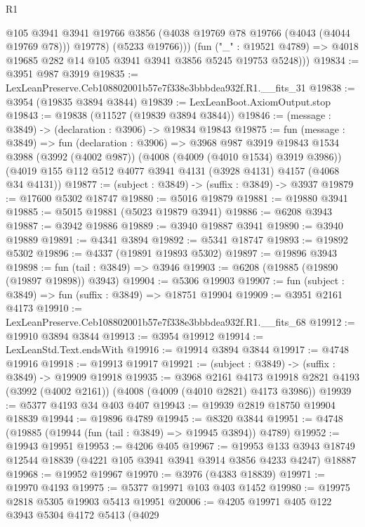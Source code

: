 \begin{lexlean}{R1}
\begin{coremodule}
              @105
              @3941
              @3941
              @19766
              @3856
              (@4038 @19769 @78 @19766 (@4043 (@4044 @19769 @78)))
              @19778)
            (@5233 @19766)))
        (fun ("_" : @19521 @4789) =>
        @4018 @19685 @282 @14 @105 @3941 @3941 @3856 @5245 @19753 @5248)))
@19834 := @3951 @987 @3919
@19835 := LexLeanPreserve.Ceb108802001b57e7f338e3bbbdea932f.R1.__fits_31
@19838 := @3954 (@19835 @3894 @3844)
@19839 := LexLeanBoot.AxiomOutput.stop
@19843 := @19838 (@11527 (@19839 @3894 @3844))
@19846 := (message : @3849) -> (declaration : @3906) -> @19834 @19843
@19875 := fun (message : @3849) =>
  fun (declaration : @3906) =>
  @3968
    @987
    @3919
    @19843
    @1534
    @3988
    (@3992 (@4002 @987))
    (@4008 (@4009 (@4010 @1534) @3919 @3986))
    (@4019 @155 @112 @512 @4077 @3941 @4131 (@3928 @4131) @4157 (@4068 @34 @4131))
@19877 := (subject : @3849) -> (suffix : @3849) -> @3937
@19879 := @17600 @5302 @18747
@19880 := @5016 @19879
@19881 := @19880 @3941
@19885 := @5015 @19881 (@5023 @19879 @3941)
@19886 := @6208 @3943
@19887 := @3942 @19886
@19889 := @3940 @19887 @3941
@19890 := @3940 @19889
@19891 := @4341 @3894
@19892 := @5341 @18747
@19893 := @19892 @5302
@19896 := @4337 (@19891 @19893 @5302)
@19897 := @19896 @3943
@19898 := fun (tail : @3849) => @3946
@19903 := @6208 (@19885 (@19890 (@19897 @19898)) @3943)
@19904 := @5306 @19903
@19907 := fun (subject : @3849) => fun (suffix : @3849) => @18751 @19904
@19909 := @3951 @2161 @4173
@19910 := LexLeanPreserve.Ceb108802001b57e7f338e3bbbdea932f.R1.__fits_68
@19912 := @19910 @3894 @3844
@19913 := @3954 @19912
@19914 := LexLeanStd.Text.endsWith
@19916 := @19914 @3894 @3844
@19917 := @4748 @19916
@19918 := @19913 @19917
@19921 := (subject : @3849) -> (suffix : @3849) -> @19909 @19918
@19935 := @3968
    @2161
    @4173
    @19918
    @2821
    @4193
    (@3992 (@4002 @2161))
    (@4008 (@4009 (@4010 @2821) @4173 @3986))
@19939 := @5377 @4193 @34 @403 @407
@19943 := @19939 @2819 @18750 @19904 @18839
@19944 := @19896 @4789
@19945 := @8320 @3844
@19951 := @4748 (@19885 (@19944 (fun (tail : @3849) => @19945 @3894)) @4789)
@19952 := @19943 @19951
@19953 := @4206 @405
@19967 := @19953
    @133
    @3943
    @18749
    @12544
    @18839
    (@4221 @105 @3941 @3941 @3914 @3856 @4233 @4247)
    @18887
@19968 := @19952 @19967
@19970 := @3976 (@4383 @18839)
@19971 := @19970 @4193
@19975 := @5377 @19971 @103 @403 @1452
@19980 := @19975 @2818 @5305 @19903 @5413 @19951
@20006 := @4205
    @19971
    @405
    @122
    @3943
    @5304
    @4172
    @5413
    (@4029

\end{coremodule}
\end{lexlean}
